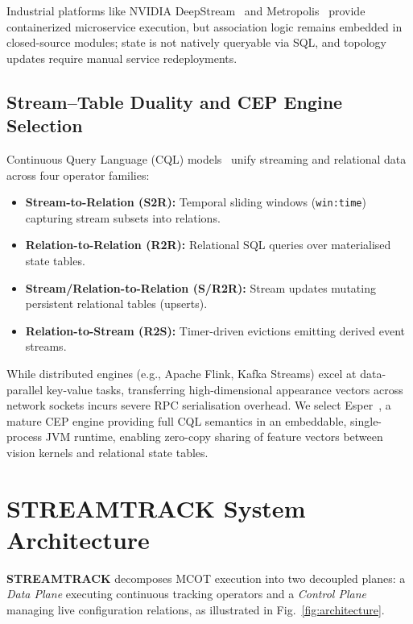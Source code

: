 \documentclass[conference]{IEEEtran}
\begin{document}
Industrial platforms like NVIDIA DeepStream~\cite{nvidia2024deepstream} and Metropolis~\cite{nvidia2025metropolis} provide containerized microservice execution, but association logic remains embedded in closed-source modules; state is not natively queryable via SQL, and topology updates require manual service redeployments.

\subsection{Stream--Table Duality and CEP Engine Selection}
Continuous Query Language (CQL) models~\cite{sax2018streams} unify streaming and relational data across four operator families:
\begin{itemize}
    \item \textbf{Stream-to-Relation (S2R):} Temporal sliding windows (\texttt{win:time}) capturing stream subsets into relations.
    \item \textbf{Relation-to-Relation (R2R):} Relational SQL queries over materialised state tables.
    \item \textbf{Stream/Relation-to-Relation (S/R2R):} Stream updates mutating persistent relational tables (upserts).
    \item \textbf{Relation-to-Stream (R2S):} Timer-driven evictions emitting derived event streams.
\end{itemize}

While distributed engines (e.g., Apache Flink, Kafka Streams) excel at data-parallel key-value tasks, transferring high-dimensional appearance vectors across network sockets incurs severe RPC serialisation overhead. We select Esper~\cite{espertech2024}, a mature CEP engine providing full CQL semantics in an embeddable, single-process JVM runtime, enabling zero-copy sharing of feature vectors between vision kernels and relational state tables.

\section{STREAMTRACK System Architecture}
\label{sec:architecture}

\textbf{STREAMTRACK} decomposes MCOT execution into two decoupled planes: a \emph{Data Plane} executing continuous tracking operators and a \emph{Control Plane} managing live configuration relations, as illustrated in Fig.~\ref{fig:architecture}.
\end{document}
